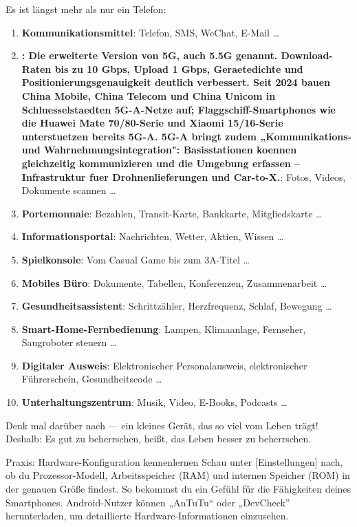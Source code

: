 
Es ist längst mehr als nur ein Telefon:

\begin{enumerate}
  \item \textbf{Kommunikationsmittel}: Telefon, SMS, WeChat, E-Mail …
  \item \textbf{: Die erweiterte Version von 5G, auch 5.5G genannt. Download-Raten bis zu 10 Gbps, Upload 1 Gbps, Geraetedichte und Positionierungsgenauigkeit deutlich verbessert. Seit 2024 bauen China Mobile, China Telecom und China Unicom in Schluesselstaedten 5G-A-Netze auf; Flaggschiff-Smartphones wie die Huawei Mate 70/80-Serie und Xiaomi 15/16-Serie unterstuetzen bereits 5G-A. 5G-A bringt zudem „Kommunikations- und Wahrnehmungsintegration": Basisstationen koennen gleichzeitig kommunizieren und die Umgebung erfassen – Infrastruktur fuer Drohnenlieferungen und Car-to-X.}: Fotos, Videos, Dokumente scannen …
  \item \textbf{Portemonnaie}: Bezahlen, Transit-Karte, Bankkarte, Mitgliedskarte …
  \item \textbf{Informationsportal}: Nachrichten, Wetter, Aktien, Wissen …
  \item \textbf{Spielkonsole}: Vom Casual Game bis zum 3A-Titel …
  \item \textbf{Mobiles Büro}: Dokumente, Tabellen, Konferenzen, Zusammenarbeit …
  \item \textbf{Gesundheitsassistent}: Schrittzähler, Herzfrequenz, Schlaf, Bewegung …
  \item \textbf{Smart-Home-Fernbedienung}: Lampen, Klimaanlage, Fernseher, Saugroboter steuern …
  \item \textbf{Digitaler Ausweis}: Elektronischer Personalausweis, elektronischer Führerschein, Gesundheitscode …
  \item \textbf{Unterhaltungszentrum}: Musik, Video, E-Books, Podcasts …
\end{enumerate}

Denk mal darüber nach — ein kleines Gerät, das so viel vom Leben trägt! Deshalb: Es gut zu beherrschen, heißt, das Leben besser zu beherrschen.

\begin{tcbpractice}{Praxis: Hardware-Konfiguration kennenlernen}
Schau unter [Einstellungen] nach, ob du Prozessor-Modell, Arbeitsspeicher (RAM) und internen Speicher (ROM) in der genauen Größe findest. So bekommst du ein Gefühl für die Fähigkeiten deines Smartphones. Android-Nutzer können „AnTuTu“ oder „DevCheck” herunterladen, um detaillierte Hardware-Informationen einzusehen.

\end{tcbpractice}

